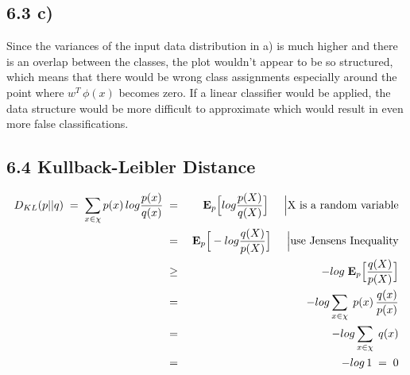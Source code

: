 \documentclass[11pt,a4paper]{article}
\begin{document}
\pagestyle{fancy}

\subsection*{6.3 c)}

Since the variances of the input data distribution in a) is much higher and there is an overlap between the classes, the plot wouldn't appear to be so structured, which means
that there would be wrong class assignments especially around the point where $w^T\,\phi(x)$ becomes zero. If a linear classifier would be applied, the data structure
would be more difficult to approximate which would result in even more false classifications.

\subsection*{6.4 Kullback-Leibler Distance}

\begin{eqnarray}
D_{KL}(p||q)\;=\; \sum_{x \in \chi} p(x)\,log \frac{p(x)}{q(x)} &\;=\;& \mathbf{E}_p \Big{[} log \frac{p(X)}{q(X)} \Big{]} \;\;\;\;\; \Big{|} \mbox{X is a random variable} \\
&\;=\;& \mathbf{E}_p \Big{[} -log \frac{q(X)}{p(X)} \Big{]} \;\;\;\;\; \Big{|} \mbox{use Jensens Inequality}  \\
&\;\geq \;& -log\; \mathbf{E}_p \Big{[} \frac{q(X)}{p(X)} \Big{]} \\
&\;=\;& -log \sum_{x \in \chi}\;p(x)\, \frac{q(x)}{p(x)} \\
&\;=\;& -log \sum_{x \in \chi}\; q(x) \\
&\;=\;& -log\,1 \;=\; 0
\end{eqnarray}
\end{document}
